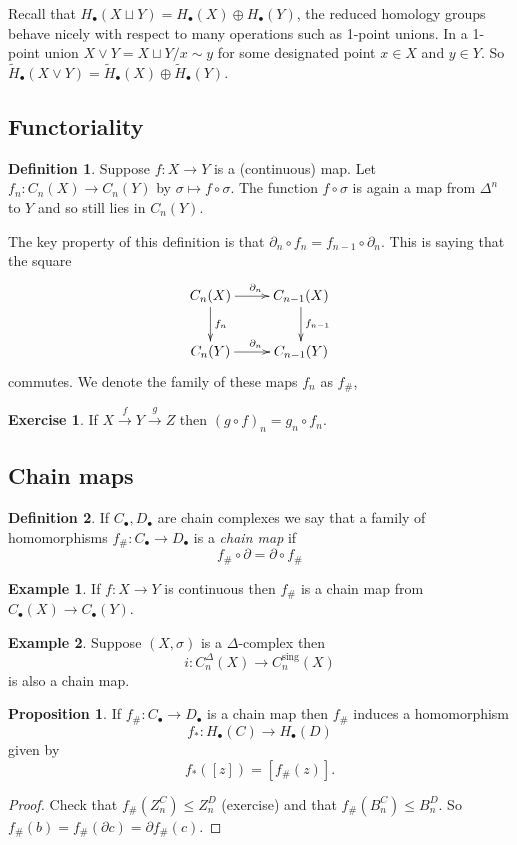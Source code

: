 \documentclass[12pt]{article}
\theoremstyle{definition}
\newtheorem*{prop}{Proposition}
\theoremstyle{definition}
\newtheorem*{defn}{Definition}
\newtheorem*{ex}{Example}
\newtheorem*{exer}{Exercise}
\newcommand{\C}{C_\bullet}
\renewcommand{\H}{H_\bullet}
\begin{document}
Recall that $\H (X\sqcup Y) = \H(X) \oplus \H(Y)$, the reduced homology groups behave nicely with respect to many operations such as 1-point unions.
In a 1-point union $X\vee Y = X\sqcup Y /x\sim y$ for some designated point $x\in X$ and $y\in Y$.
So $\tilde \H(X\vee Y) = \tilde \H(X) \oplus \tilde \H(Y)$.

\subsection{Functoriality}
\begin{defn}
Suppose $f\colon X \to Y$ is a (continuous) map.
Let $f_n\colon C_n(X) \to C_n(Y)$ by $\sigma \mapsto f\circ \sigma$.
The function $f\circ \sigma$ is again a map from $\Delta^n$ to $Y$ and so still lies in $C_n(Y)$.

The key property of this definition is that $\partial_n\circ f_n = f_{n-1}\circ \partial_n$.
This is saying that the square
\[
\xymatrix{
C_n(X)\ar[d]^{f_{n}} \ar[r]^{\partial_n} & C_{n-1}(X) \ar[d]^{f_{n-1}}\\
C_n(Y) \ar[r]^{\partial_n} & C_{n-1}(Y)\\
}
\]
commutes.
We denote the family of these maps $f_n$ as $f_\#$,
\end{defn}

\begin{exer}
If $X \xrightarrow{f} Y \xrightarrow{g} Z$ then $(g\circ f)_n = g_n \circ f_n$.
\end{exer}

\subsection{Chain maps}
\begin{defn}
If $\C, D_\bullet$ are chain complexes we say that a family of homomorphisms $f_\#\colon \C \to D_\bullet$ is  a \emph{chain map} if 
\[
f_\#\circ \partial = \partial \circ f_\#
\]
\end{defn}

\begin{ex}
If $f\colon X \to Y$ is continuous then $f_\#$ is a chain map from $\C (X) \to \C(Y)$.
\end{ex}
\begin{ex}
Suppose $(X,\sigma)$ is a $\Delta$-complex then 
\[
i\colon C_n^\Delta(X) \to C_n^\text{sing}(X)
\]
is also a chain map.
\end{ex}

\begin{prop}
If $f_\#\colon \C \to D_\bullet$ is a chain map then $f_\#$ induces a homomorphism
\[
f_*\colon \H(C) \to \H(D)
\]
given by
\[
f_*([z]) = [f_\#(z)].
\]
\end{prop}
\begin{proof}
Check that $f_\#(Z_n^C) \le Z_n^D$ (exercise) and that $f_\#(B_n^C) \le B_n^D$.
So $f_\#(b) = f_\#(\partial c )  = \partial f_\#(c)$.
\end{proof}
\end{document}
